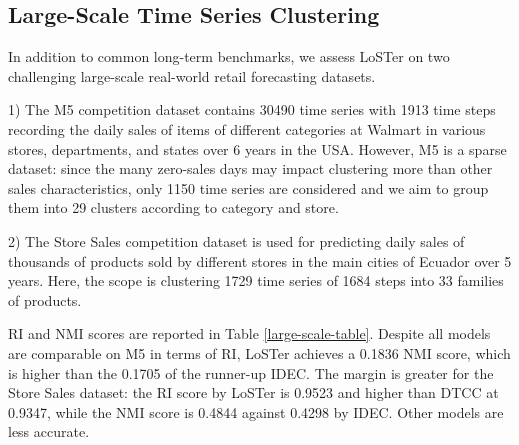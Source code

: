 \documentclass[times, review, 10pt]{elsarticle}
\begin{document}
\subsection{Large-Scale Time Series Clustering}
\begin{table}[!htb]
  \caption{Rand Index (RI) and Normalized Mutual Index (NMI) for real-world retail datasets. The best results are highlighted.}
  \label{large-scale-table}
  \vskip 0.1in
  \centering
  \vskip -0.1in
\end{table}

In addition to common long-term benchmarks, we assess LoSTer on two challenging large-scale real-world retail forecasting datasets.

1) The M5 competition dataset contains 30490 time series with 1913 time steps recording the daily sales of items of different categories at Walmart in various stores, departments, and states over 6 years in the USA. However, M5 is a sparse dataset: since the many zero-sales days may impact clustering more than other sales characteristics, only 1150 time series are considered and we aim to group them into 29 clusters according to category and store.

2) The Store Sales competition dataset is used for predicting daily sales of thousands of products sold by different stores in the main cities of Ecuador over 5 years. Here, the scope is clustering 1729 time series of 1684 steps into 33 families of products.

RI and NMI scores are reported in Table \ref{large-scale-table}. Despite all models are comparable on M5 in terms of RI, LoSTer achieves a 0.1836 NMI score, which is higher than the 0.1705 of the runner-up IDEC. The margin is greater for the Store Sales dataset: the RI score by LoSTer is 0.9523 and higher than DTCC at 0.9347, while the NMI score is 0.4844 against 0.4298 by IDEC. Other models are less accurate.
\end{document}
